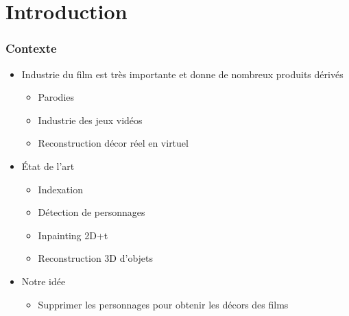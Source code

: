\section{Introduction}

 \begin{frame}
   \frametitle{Contexte}
   
   \begin{itemize}
   
   \item Industrie du film est très importante et donne de nombreux produits dérivés
   	\begin{itemize}
   	\item Parodies
   	\item Industrie des jeux vidéos
   	\item Reconstruction décor réel en virtuel
   	\end{itemize}
   
   \item État de l'art
   	\begin{itemize}
   	\item Indexation
   	\item Détection de personnages
   	\item Inpainting 2D+t
   	\item Reconstruction 3D d'objets

   	\end{itemize}
   	
   \item Notre idée
   	\begin{itemize}
   	\item Supprimer les personnages pour obtenir les décors des films
   	\end{itemize}
   
   \end{itemize}
 
 \end{frame}


